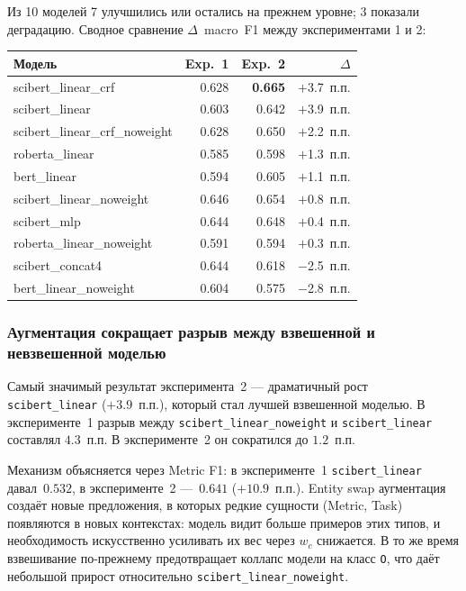 Из 10 моделей 7 улучшились или остались на прежнем уровне; 3 показали деградацию.
Сводное сравнение $\Delta$~macro~F1 между экспериментами 1 и 2:

\begin{center}
\begin{tabular}{lrrr}
\toprule
Модель & Exp.~1 & Exp.~2 & $\Delta$ \\
\midrule
scibert\_linear\_crf   & 0.628 & \textbf{0.665} & $+$3.7~п.п. \\
scibert\_linear        & 0.603 & 0.642 & $+$3.9~п.п. \\
scibert\_linear\_crf\_noweight & 0.628 & 0.650 & $+$2.2~п.п. \\
roberta\_linear        & 0.585 & 0.598 & $+$1.3~п.п. \\
bert\_linear           & 0.594 & 0.605 & $+$1.1~п.п. \\
scibert\_linear\_noweight & 0.646 & 0.654 & $+$0.8~п.п. \\
scibert\_mlp           & 0.644 & 0.648 & $+$0.4~п.п. \\
roberta\_linear\_noweight & 0.591 & 0.594 & $+$0.3~п.п. \\
\midrule
scibert\_concat4       & 0.644 & 0.618 & $-$2.5~п.п. \\
bert\_linear\_noweight & 0.604 & 0.575 & $-$2.8~п.п. \\
\bottomrule
\end{tabular}
\end{center}

\subsubsection{Аугментация сокращает разрыв между взвешенной и невзвешенной моделью}

Самый значимый результат эксперимента~2 --- драматичный рост \texttt{scibert\_linear} ($+3.9$~п.п.), который стал лучшей взвешенной моделью. В эксперименте~1 разрыв между \texttt{scibert\_linear\_noweight} и \texttt{scibert\_linear} составлял $4.3$~п.п. В эксперименте~2 он сократился до $1.2$~п.п.

Механизм объясняется через Metric F1: в эксперименте~1 \texttt{scibert\_linear} давал~$0.532$, в эксперименте~2 ---~$0.641$ ($+10.9$~п.п.). Entity swap аугментация создаёт новые предложения, в которых редкие сущности (Metric, Task) появляются в новых контекстах: модель видит больше примеров этих типов, и необходимость искусственно усиливать их вес через $w_c$ снижается. В то же время взвешивание по-прежнему предотвращает коллапс модели на класс \texttt{O}, что даёт небольшой прирост относительно \texttt{scibert\_linear\_noweight}.

